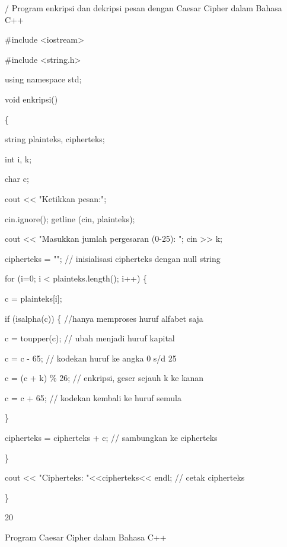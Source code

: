 \documentclass{article}
\begin{document}

/ Program enkripsi dan dekripsi pesan dengan Caesar Cipher dalam Bahasa C++ 

\#include <iostream>

\#include <string.h>

using namespace std;

void enkripsi()

\{

  string plainteks, cipherteks;

  int i, k;

  char c;

  cout << "Ketikkan pesan:";

  cin.ignore(); getline (cin, plainteks);

  cout << "Masukkan jumlah pergesaran (0-25): "; cin >> k;

  cipherteks = "";  // inisialisasi cipherteks dengan null string


  for (i=0; i < plainteks.length(); i++) \{

      c = plainteks[i];

      if (isalpha(c)) \{    //hanya memproses huruf alfabet saja

         c = toupper(c);   // ubah menjadi huruf kapital 

         c = c - 65;       // kodekan huruf ke angka 0 s/d 25    

         c = (c + k) \% 26; // enkripsi, geser sejauh k ke kanan

         c = c + 65;       // kodekan kembali ke huruf semula          

      \}      

      cipherteks = cipherteks + c;  // sambungkan ke cipherteks

  \}

  cout << "Cipherteks: "<<cipherteks<< endl;  // cetak cipherteks

\}

20

Program Caesar Cipher dalam Bahasa C++
\end{document}
